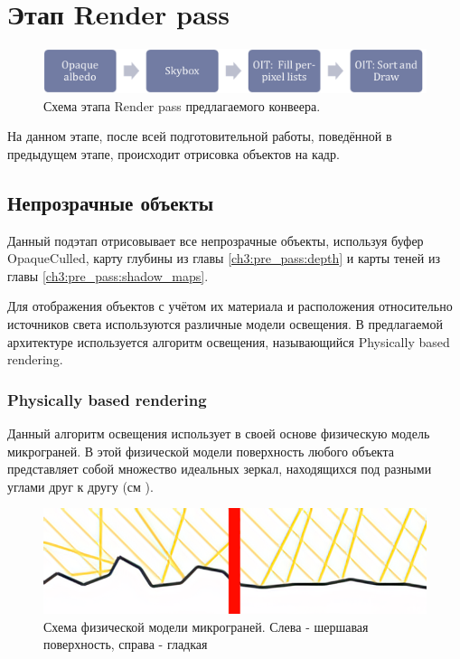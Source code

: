 \section{Этап Render pass} \label{ch3:render_pass}
	\begin{figure}[ht!] 
		\center
		\includegraphics [scale=0.4] {my_folder/images//renderpass_schema}	
		\caption{Схема этапа Render pass предлагаемого конвеера.} 
		\label{fig:renderpass_schema}
	\end{figure}
	
	На данном этапе, после всей подготовительной работы, поведённой в предыдущем этапе, происходит отрисовка объектов на кадр.
	
	\subsection{Непрозрачные объекты} \label{ch3:render_pass:opaque}
		Данный подэтап отрисовывает все непрозрачные объекты, используя буфер OpaqueCulled, карту глубины из главы \ref{ch3:pre_pass:depth} и карты теней из главы \ref{ch3:pre_pass:shadow_maps}.
		
		Для отображения объектов с учётом их материала и расположения относительно источников света используются различные модели освещения. В предлагаемой архитектуре используется алгоритм освещения, называющийся Physically based rendering\cite{pharr2016physically}.
	
		\subsubsection{Physically based rendering} \label{ch3:render_pass:opaque:pbr}
			Данный алгоритм освещения использует в своей основе физическую модель микрограней\cite{walter2007microfacet}. В этой физической модели поверхность любого объекта представляет собой множество идеальных зеркал, находящихся под разными углами друг к другу (см ).
			
			\begin{figure}[ht!] 
				\center
				\includegraphics [scale=0.4] {my_folder/images//microfacet}	
				\caption{Схема физической модели микрограней. Слева - шершавая поверхность, справа - гладкая} 
				\label{fig:microfacet}
			\end{figure}
			
